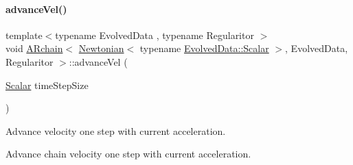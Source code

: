 \paragraph{\texorpdfstring{advance\+Vel()}{advanceVel()}}
{\footnotesize\ttfamily template$<$typename Evolved\+Data , typename Regularitor $>$ \\
void \mbox{\hyperlink{class_a_rchain}{A\+Rchain}}$<$ \mbox{\hyperlink{class_newtonian}{Newtonian}}$<$ typename \mbox{\hyperlink{class_a_rchain_a707e42a79e4744424a34c9007e84ee07}{Evolved\+Data\+::\+Scalar}} $>$, Evolved\+Data, Regularitor $>$\+::advance\+Vel (\begin{DoxyParamCaption}\item[{\mbox{\hyperlink{class_a_rchain_3_01_newtonian_3_01typename_01_evolved_data_1_1_scalar_01_4_00_01_evolved_data_00_01_regularitor_01_4_a2c77dc1b58a25ac5c6ee95dd7809f693}{Scalar}}}]{time\+Step\+Size }\end{DoxyParamCaption})}



Advance velocity one step with current acceleration. 

Advance chain velocity one step with current acceleration.

